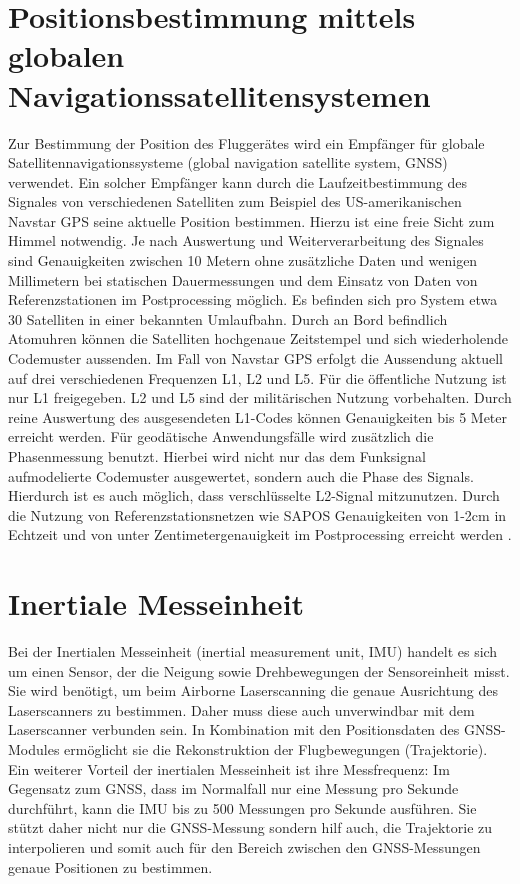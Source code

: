 \documentclass[a4paper,12pt,bibliography=totoc, listof=totoc,titlepage,pointlessnumbers]{scrreprt}
\begin{document}
\section{Positionsbestimmung mittels globalen Navigationssatellitensystemen}
\label{s:GNSS}
Zur Bestimmung der Position des Fluggerätes wird ein Empfänger für globale Satellitennavigationssysteme (global navigation satellite system, GNSS) verwendet. Ein solcher Empfänger kann durch die Laufzeitbestimmung des Signales von verschiedenen Satelliten zum Beispiel des US-amerikanischen Navstar GPS seine aktuelle Position bestimmen. Hierzu ist eine freie Sicht zum Himmel notwendig. Je nach Auswertung und Weiterverarbeitung des Signales sind Genauigkeiten zwischen 10 Metern ohne zusätzliche Daten und wenigen Millimetern bei statischen Dauermessungen und dem Einsatz von Daten von Referenzstationen im Postprocessing möglich. Es befinden sich pro System etwa 30 Satelliten in einer bekannten Umlaufbahn. Durch an Bord befindlich Atomuhren können die Satelliten hochgenaue Zeitstempel und sich wiederholende Codemuster aussenden. Im Fall von Navstar GPS erfolgt die Aussendung aktuell auf drei verschiedenen Frequenzen L1, L2 und L5. Für die öffentliche Nutzung ist nur L1 freigegeben. L2 und L5 sind der militärischen Nutzung vorbehalten. Durch reine Auswertung des ausgesendeten L1-Codes können Genauigkeiten bis 5 Meter erreicht werden. Für geodätische Anwendungsfälle wird zusätzlich die Phasenmessung benutzt. Hierbei wird nicht nur das dem Funksignal aufmodelierte Codemuster ausgewertet, sondern auch die Phase des Signals. Hierdurch ist es auch möglich, dass verschlüsselte L2-Signal mitzunutzen. Durch die Nutzung von Referenzstationsnetzen wie SAPOS Genauigkeiten von 1-2cm in Echtzeit und von unter Zentimetergenauigkeit im Postprocessing erreicht werden \citep[S. 375]{Witte2006}.

\section{Inertiale Messeinheit}
\label{s:IMU}
Bei der Inertialen Messeinheit (inertial measurement unit, IMU) handelt es sich um einen Sensor, der die Neigung sowie Drehbewegungen der Sensoreinheit misst. Sie wird benötigt, um beim Airborne Laserscanning die genaue Ausrichtung des Laserscanners zu bestimmen. Daher muss diese auch unverwindbar mit dem Laserscanner verbunden sein. In Kombination mit den Positionsdaten des GNSS-Modules ermöglicht sie die Rekonstruktion der Flugbewegungen (Trajektorie). Ein weiterer Vorteil der inertialen Messeinheit ist ihre Messfrequenz: Im Gegensatz zum GNSS, dass im Normalfall nur eine Messung pro Sekunde durchführt, kann die IMU bis zu 500 Messungen pro Sekunde ausführen. Sie stützt daher nicht nur die GNSS-Messung sondern hilf auch, die Trajektorie zu interpolieren und somit auch für den Bereich zwischen den GNSS-Messungen genaue Positionen zu bestimmen. \citep[S. 23ff]{beraldin}
\end{document}
